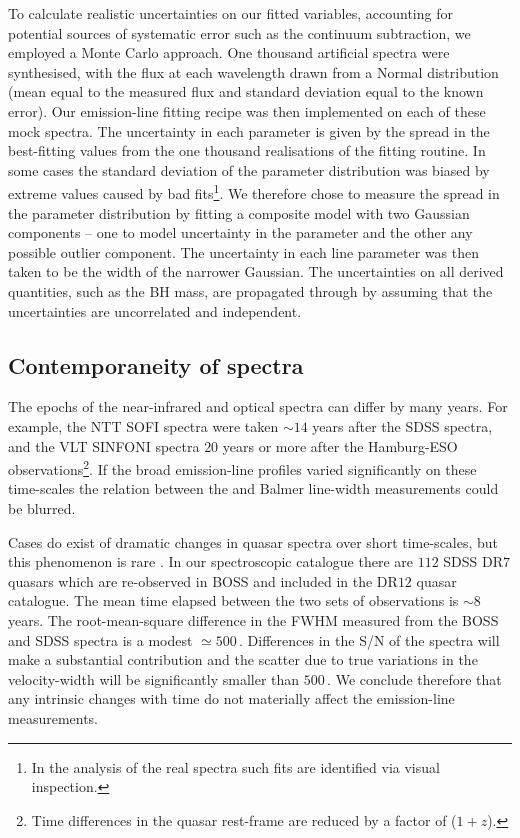 To calculate realistic uncertainties on our fitted variables, accounting for potential sources of systematic error such as the continuum subtraction, we employed a Monte Carlo approach. 
One thousand artificial spectra were synthesised, with the flux at each wavelength drawn from a Normal distribution (mean equal to the measured flux and standard deviation equal to the known error).
Our emission-line fitting recipe was then implemented on each of these mock spectra. 
The uncertainty in each parameter is given by the spread in the best-fitting values from the one thousand realisations of the fitting routine. 
In some cases the standard deviation of the parameter distribution was biased by extreme values caused by bad fits\footnote{In the analysis of the real spectra such fits are identified via visual inspection.}. 
We therefore chose to measure the spread in the parameter distribution by fitting a composite model with two Gaussian components -- one to model uncertainty in the parameter and the other any possible outlier component. 
The uncertainty in each line parameter was then taken to be the width of the narrower Gaussian. 
The uncertainties on all derived quantities, such as the BH mass, are propagated through by assuming that the uncertainties are uncorrelated and independent. 

\subsection{Contemporaneity of spectra}

The epochs of the near-infrared and optical spectra can differ by many years.
For example, the NTT SOFI spectra were taken $\sim14$ years after the SDSS spectra, and the VLT SINFONI spectra $20$ years or more after the Hamburg-ESO observations\footnote{Time differences in the quasar rest-frame are reduced by a factor of ($1 + z$).}.
If the broad emission-line profiles varied significantly on these time-scales the relation between the  and Balmer line-width measurements could be blurred. 

Cases do exist of dramatic changes in quasar spectra over short time-scales, but this phenomenon is rare \citep{macleod16}. 
In our spectroscopic catalogue there are $112$ SDSS DR$7$ quasars which are re-observed in BOSS and included in the DR$12$ quasar catalogue. 
The mean time elapsed between the two sets of observations is $\sim8$ years. 
The root-mean-square difference in the  FWHM measured from the BOSS and SDSS spectra is a modest $\simeq500$\,\kms. 
Differences in the S/N of the spectra will make a substantial contribution and the scatter due to true variations in the  velocity-width will be significantly smaller than $500$\,\kms. 
We conclude therefore that any intrinsic changes with time do not materially affect the emission-line measurements.

